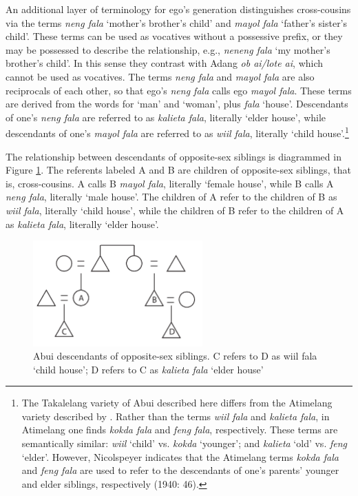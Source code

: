 An additional layer of terminology for ego's generation distinguishes cross-cousins via the terms \textit{neng fala} `mother's brother's child' and \textit{mayol fala} `father's sister's child'. These terms can be used as vocatives without a possessive prefix, or they may be possessed to describe the relationship, e.g., \textit{neneng fala} `my mother's brother's child'. In this sense they contrast with Adang \textit{ob ai/lote ai}, which cannot be used as vocatives. The terms \textit{neng fala} and \textit{mayol fala} are also reciprocals of each other, so that ego's \textit{neng fala} calls ego \textit{mayol fala}. These terms are derived from the words for `man' and `woman', plus \textit{fala} `house'. Descendants of one's \textit{neng fala} are referred to as \textit{kalieta fala}, literally `elder house', while descendants of one's \textit{mayol fala} are referred to as \textit{wiil fala}, literally `child house'.\footnote{The Takalelang variety of Abui described here differs from the Atimelang variety described by \citet{Nicolspeyer1940}. Rather than the terms \textit{wiil fala} and \textit{kalieta fala}, in Atimelang one finds \textit{kokda fala} and \textit{feng fala}, respectively. These terms are semantically similar: \textit{wiil} `child' vs. \textit{kokda} `younger'; and \textit{kalieta} `old' vs. \textit{feng} `elder'. However, Nicolspeyer indicates that the Atimelang terms \textit{kokda fala} and \textit{feng fala} are used to refer to the descendants of one's parents' younger and elder siblings, respectively (1940: 46).}  

The relationship between descendants of opposite-sex siblings is diagrammed in Figure \ref{fig:5:11}. The referents labeled A and B are children of opposite-sex siblings, that is, cross-cousins. A calls B \textit{mayol fala}, literally `female house', while B calls A \textit{neng fala}, literally `male house'. The children of A refer to the children of B as \textit{wiil fala}, literally `child house', while the children of B refer to the children of A as \textit{kalieta fala}, literally `elder house'. 

\begin{figure}[h]
\centering
\includegraphics[width=6.5cm]{figures/Holton_ch5_fig11.pdf}
\caption[Abui descendants of opposite-sex siblings]{Abui descendants of opposite-sex siblings. C refers to D as wiil fala `child house'; D refers to C as \textit{kalieta fala} `elder house'}
\label{fig:5:11}
\end{figure}  

